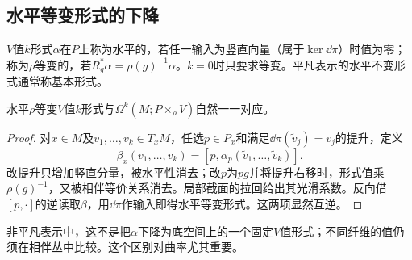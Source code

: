 \subsection{水平等变形式的下降}
\begin{definition}
$V$值$k$形式$\alpha$在$P$上称为水平的，若任一输入为竖直向量（属于$\ker\dd\pi$）时值为零；称为$\rho$等变的，若$R_g^*\alpha=\rho(g)^{-1}\alpha$。$k=0$时只要求等变。平凡表示的水平不变形式通常称基本形式。
\end{definition}
\begin{proposition}\label{prop:bundle-tensorial-descent}
水平$\rho$等变$V$值$k$形式与$\Omega^k(M;P\times_\rho V)$自然一一对应。
\end{proposition}
\begin{proof}
对$x\in M$及$v_1,\ldots,v_k\in T_xM$，任选$p\in P_x$和满足$\dd\pi(\widetilde v_j)=v_j$的提升，定义
\[
 \beta_x(v_1,\ldots,v_k)=[p,\alpha_p(\widetilde v_1,\ldots,\widetilde v_k)].
\]
改提升只增加竖直分量，被水平性消去；改$p$为$pg$并将提升右移时，形式值乘$\rho(g)^{-1}$，又被相伴等价关系消去。局部截面的拉回给出其光滑系数。反向借$[p,\cdot]$的逆读取$\beta$，用$\dd\pi$作输入即得水平等变形式。这两项显然互逆。
\end{proof}
非平凡表示中，这不是把$\alpha$下降为底空间上的一个固定$V$值形式；不同纤维的值仍须在相伴丛中比较。这个区别对曲率尤其重要。
